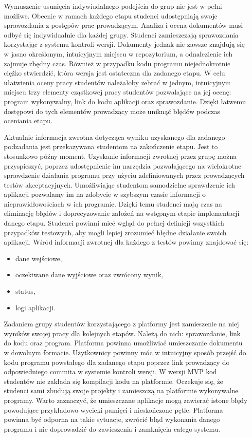 Wymuszenie usunięcia indywiudalnego podejścia do grup nie jest w pełni możliwe. 
Obecnie w ramach każdego etapu studenci udostępniają swoje sprawozdania z postępów prac prowadzącym.
Analiza i ocena dokumentów musi odbyć się indywidualnie dla każdej grupy.
Studenci zamieszczają sprawozdania korzystając z systemu kontroli wersji.
Dokumenty jednak nie zawsze znajdują się w jasno określonym, intuicyjnym miejscu w repozytorium, a odnalezienie ich zajmuje zbędny czas.
Również w przypadku kodu programu niejednokrotnie ciężko stwierdzić, która wersja jest ostateczna dla zadanego etapu.
W celu ułatwienia oceny pracy studentów należałoby zebrać w jednym, intuicyjnym miejscu trzy elementy cząstkowej pracy studentów pozwalające na jej ocenę: program wykonywalny, link do kodu aplikacji oraz sprawozdanie.
Dzięki łatwemu dostępowi do tych elementów prowadzący może uniknąć błędów podczas oceniania etapu.
 
Aktualnie informacja zwrotna dotycząca wyniku uzyskanego dla zadanego podzadania jest przekazywana studentom na zakończenie etapu.
Jest to stosunkowo późny moment.
Uzyskanie informacji zwrotnej przez grupę można przyspieszyć, poprzez udostępnienie im narzędzia pozwalającego na wielokrotne sprawdzenie działania programu przy użyciu zdefiniowanych przez prowadzących testów akceptacyjnych.
Umożliwiając studentom samodzielne sprawdzenie ich aplikacji pozwalamy im na zdobycie w szybszym czasie informacji o nieprawidłowościach w ich programie.
Dzięki temu studenci mają czas na eliminację błędów i doprecyzowanie założeń na wstępnym etapie implementacji danego etapu.
Studenci powinni mieć wgląd do pełnej definicji wszystkich przypadków testowych, aby mogli lepiej zrozumieć błędne działanie swoich aplikacji.
Wśród informacji zwrotnej dla każdego z testów powinny znajdować się:
\begin{itemize}
\item dane wejściowe,
\item oczekiwane dane wyjściowe oraz zwrócony wynik,
\item status,
\item logi aplikacji.
\end{itemize}

Zadaniem grupy studentów korzystającego z platformy jest zamieszenie na niej wyników swojej pracy dla kolejnych etapów.
Należą do nich: sprawozdanie, link do kodu oraz program.
Platforma powinna umożliwiać umieszczanie dokumentu w dowolnym formacie.
Użytkownicy powinny móc w intuicyjny sposób przejść do kodu programu powstałego dla zadanego etapu poprzez link prowadzący do odpowiedniego commita w systemie kontroli wersji.
W wersji MVP kod studentów nie zakłada się kompilacji kodu na platformie.
Oczekuje się, że studenci sami zbudują swoje projekty i zamieszczą na platformie wykonywalne programy.
Warto zaznaczyć, że umieszczane aplikacje mogą zawierać istone błędy powodujące przykładowo wycieki pamięci i nieskończone pętle.
Platforma powinna być odporna na takie sytuacje, zwrócić błąd wykonania danego programu i nie doprowadzić do zawieszenia i zamknięcia całego systemu.


